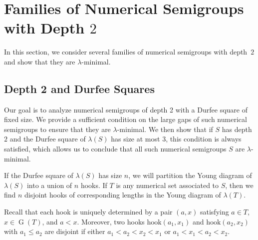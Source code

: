 \documentclass{amsproc}
\DeclareMathOperator{\G}{G}
\newcommand{\hook}{\text{hook}}
\theoremstyle{definition}
\theoremstyle{remark}
\numberwithin{equation}{section}
\begin{document}
\section{Families of Numerical Semigroups with Depth $2$}\label{sec:depth2}

In this section, we consider several families of numerical semigroups with depth~$2$ and show that they are $\lambda$-minimal.

\subsection{Depth 2 and Durfee Squares}

Our goal is to analyze numerical semigroups of depth 2 with a Durfee square of fixed size. 
We provide a sufficient condition on the large gaps of such numerical semigroups to ensure that they are $\lambda$-minimal.
We then show that if $S$ has depth $2$ and the Durfee square of $\lambda(S)$ has size at most $3$, this condition is always satisfied, which allows us to conclude that all such numerical semigroups $S$ are $\lambda$-minimal.


If the Durfee square of $\lambda(S)$ has size $n$, we will partition the Young diagram of $\lambda(S)$ into a union of $n$ hooks. If $T$ is any numerical set associated to $S$, then we find $n$ disjoint hooks of corresponding lengths in the Young diagram of $\lambda(T)$. 

Recall that each hook is uniquely determined by a pair $(a,x)$ satisfying $a\in T$, $x\in \G(T)$, and $a<x$. Moreover, two hooks $\hook(a_1,x_1)$ and $\hook(a_2,x_2)$ with $a_1\leq a_2$ are disjoint if either $a_1<a_2<x_2<x_1$ or $a_1<x_1<a_2<x_2$.
\end{document}
